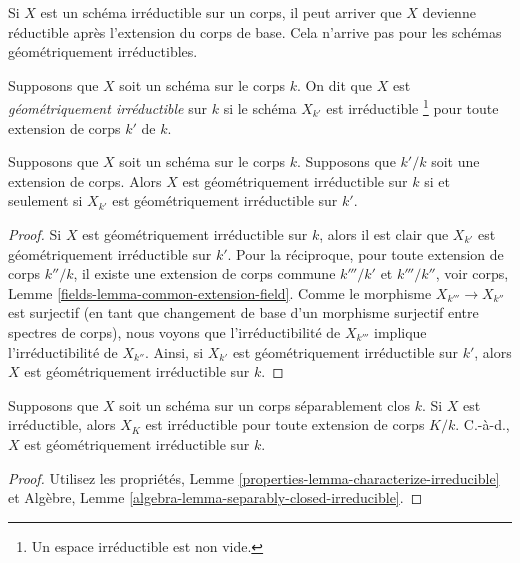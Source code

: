 \noindent
Si $X$ est un schéma irréductible sur un corps, il peut arriver
que $X$ devienne réductible après l'extension du corps de base.
Cela n'arrive pas pour les schémas géométriquement irréductibles.

\begin{definition}
\label{definition-geometrically-irreducible}
Supposons que $X$ soit un schéma sur le corps $k$. On dit que
$X$ est {\it géométriquement irréductible } sur $k$ si le
schéma $X_{k'}$ est irréductible \footnote { Un espace
irréductible est non vide. } pour toute extension de corps $k'$ de $k$.
\end{definition}

\begin{lemma}
\label{lemma-geometrically-irreducible-check-after-extension}
Supposons que $X$ soit un schéma sur le corps $k$.
Supposons que $k'/k$ soit une extension de corps. Alors
$X$ est géométriquement irréductible sur $k$ si et
seulement si $X_{k'}$ est géométriquement irréductible sur $k'$.
\end{lemma}

\begin{proof}
Si $X$ est géométriquement irréductible sur $k$, alors il est
clair que $X_{k'}$ est géométriquement irréductible sur $k'$.
Pour la réciproque, pour toute extension de corps $k''/k$, il
existe une extension de corps commune $k'''/k'$ et $k'''/k''$,
voir corps, Lemme \ref{fields-lemma-common-extension-field}. Comme
le morphisme $X_{k'''} \to X_{k''}$ est surjectif (en tant que
changement de base d'un morphisme surjectif entre spectres de
corps), nous voyons que l'irréductibilité de $X_{k'''}$ implique
l'irréductibilité de $X_{k''}$. Ainsi, si $X_{k'}$ est géométriquement
irréductible sur $k'$, alors $X$ est géométriquement irréductible sur $k$.
\end{proof}

\begin{lemma}
\label{lemma-separably-closed-irreducible}
Supposons que $X$ soit un schéma sur un corps
séparablement clos $k$. Si $X$ est irréductible, alors
$X_K$ est irréductible pour toute extension de corps
$K/k$. C.-à-d., $X$ est géométriquement irréductible sur $k$.
\end{lemma}

\begin{proof}
Utilisez les propriétés, Lemme
\ref{properties-lemma-characterize-irreducible} et Algèbre, Lemme \ref{algebra-lemma-separably-closed-irreducible}.
\end{proof}


